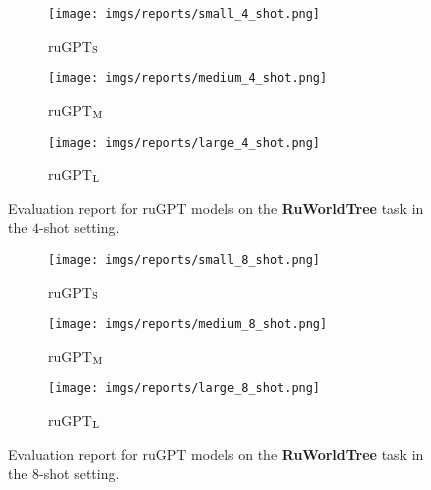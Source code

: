 \documentclass[11pt]{article}
\begin{document}
\begin{figure*}[p!]
    \centering
    \begin{subfigure}[b]{0.75\textwidth}
        \texttt{[image: imgs/reports/small\_4\_shot.png]}
        \caption{ruGPT$_\textsc{S}$}
    \end{subfigure}
    \begin{subfigure}[b]{0.75\textwidth}
        \texttt{[image: imgs/reports/medium\_4\_shot.png]}
        \caption{ruGPT$_\textsc{M}$}
    \end{subfigure}
    \begin{subfigure}[b]{0.75\textwidth}
        \texttt{[image: imgs/reports/large\_4\_shot.png]}
        \caption{ruGPT$_\textsc{L}$}
    \end{subfigure}
    \caption{Evaluation report for ruGPT models on the \textbf{RuWorldTree} task in the $4$-shot setting.}
    \label{fig:report4}
\end{figure*}

\begin{figure*}[p!]
    \centering
    \begin{subfigure}[b]{0.75\textwidth}
        \texttt{[image: imgs/reports/small\_8\_shot.png]}
        \caption{ruGPT$_\textsc{S}$}
    \end{subfigure}
    \begin{subfigure}[b]{0.75\textwidth}
        \texttt{[image: imgs/reports/medium\_8\_shot.png]}
        \caption{ruGPT$_\textsc{M}$}
    \end{subfigure}
    \begin{subfigure}[b]{0.75\textwidth}
        \texttt{[image: imgs/reports/large\_8\_shot.png]}
        \caption{ruGPT$_\textsc{L}$}
    \end{subfigure}
    \caption{Evaluation report for ruGPT models on the \textbf{RuWorldTree} task in the $8$-shot setting.}
    \label{fig:report8}
\end{figure*} 
\end{document}
